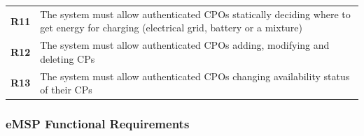 \begin{table}[H]
\begin{tabularx}{\textwidth}{cX}
        \textbf{R11} & The system must allow authenticated CPOs statically deciding where to get energy for charging (electrical grid, battery or a mixture)                    \\
        \textbf{R12} & The system must allow authenticated CPOs adding, modifying and deleting CPs                                                                              \\
        \textbf{R13} & The system must allow authenticated CPOs changing availability status of their CPs                                                                       \\
        \bottomrule
    \end{tabularx}
\end{table}
\subsubsection{eMSP Functional Requirements}
